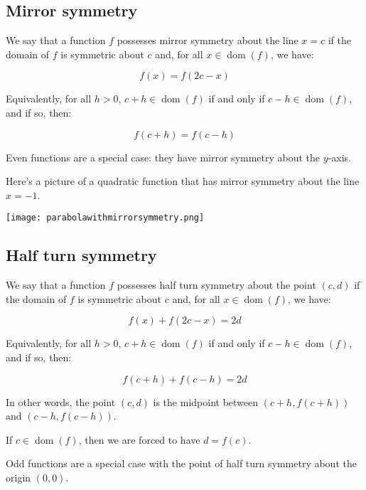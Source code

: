 \documentclass{amsart}
\begin{document}
\subsection{Mirror symmetry}

We say that a function $f$ possesses mirror symmetry about the line $x
= c$ if the domain of $f$ is symmetric about $c$ and, for all $x \in
\operatorname{dom}(f)$, we have:

\begin{equation*}
  f(x) = f(2c - x)
\end{equation*}

Equivalently, for all $h > 0$, $c + h \in \operatorname{dom}(f)$ if
and only if $c - h \in \operatorname{dom}(f)$, and if so, then:

\begin{equation*}
  f(c + h) = f(c - h)
\end{equation*}

Even functions are a special case: they have mirror symmetry about the
$y$-axis.

Here's a picture of a quadratic function that has mirror symmetry
about the line $x = -1$.

\texttt{[image: parabolawithmirrorsymmetry.png]}

\subsection{Half turn symmetry}

We say that a function $f$ possesses half turn symmetry about the
point $(c,d)$ if the domain of $f$ is symmetric about $c$ and, for all
$x \in \operatorname{dom}(f)$, we have:

\begin{equation*}
  f(x) + f(2c - x) = 2d
\end{equation*}

Equivalently, for all $h > 0$, $c + h \in \operatorname{dom}(f)$ if
and only if $c - h \in \operatorname{dom}(f)$, and if so, then:

\begin{equation*}
  f(c + h) + f(c - h) = 2d
\end{equation*}

In other words, the point $(c,d)$ is the midpoint between $(c + h, f(c
+ h))$ and $(c - h, f(c - h))$.

If $c \in \operatorname{dom}(f)$, then we are forced to have $d =
f(c)$.

Odd functions are a special case with the point of half turn symmetry
about the origin $(0,0)$.
\end{document}
